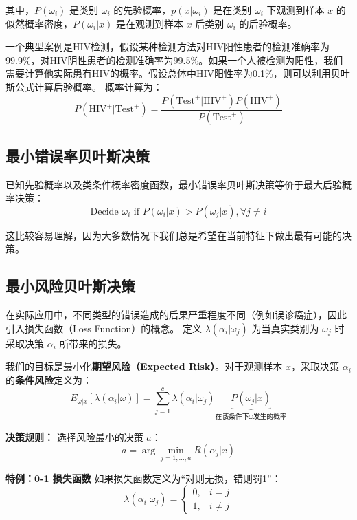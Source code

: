 \documentclass[a4paper, 11pt]{ctexart}
\begin{document}
其中，$P(\omega_i)$ 是类别 $\omega_i$ 的先验概率，$p(x|\omega_i)$ 是在类别 $\omega_i$ 下观测到样本 $x$ 的似然概率密度，$P(\omega_i|x)$ 是在观测到样本 $x$ 后类别 $\omega_i$ 的后验概率。

一个典型案例是HIV检测，假设某种检测方法对HIV阳性患者的检测准确率为99.9\%，对HIV阴性患者的检测准确率为99.5\%。如果一个人被检测为阳性，我们需要计算他实际患有HIV的概率。假设总体中HIV阳性率为0.1\%，则可以利用贝叶斯公式计算后验概率。
概率计算为：
\begin{equation}
    P(\text{HIV}^+| \text{Test}^+) = \frac{P(\text{Test}^+|\text{HIV}^+)P(\text{HIV}^+)}{P(\text{Test}^+)}
\end{equation}

\subsection{最小错误率贝叶斯决策}
已知先验概率以及类条件概率密度函数，最小错误率贝叶斯决策等价于最大后验概率决策：
\begin{equation}
    \text{Decide } \omega_i \text{ if } P(\omega_i|x) > P(\omega_j|x), \forall j \neq i
\end{equation}

这比较容易理解，因为大多数情况下我们总是希望在当前特征下做出最有可能的决策。

\subsection{最小风险贝叶斯决策}
在实际应用中，不同类型的错误造成的后果严重程度不同（例如误诊癌症），因此引入损失函数（Loss Function）的概念。
定义 $\lambda(\alpha_i|\omega_j)$ 为当真实类别为 $\omega_j$ 时采取决策 $\alpha_i$ 所带来的损失。

我们的目标是最小化\textbf{期望风险（Expected Risk）}。对于观测样本 $x$，采取决策 $\alpha_i$ 的\textbf{条件风险}定义为：
\begin{equation}
   E_{\omega|x}[\lambda(\alpha_i|\omega)] = \sum_{j=1}^{c} \lambda(\alpha_i|\omega_j) \underbrace{P(\omega_j|x)}_{\text{在该条件下}\omega\text{发生的概率}}
\end{equation}

\textbf{决策规则：}
选择风险最小的决策 $a$：
\begin{equation}
    a = \arg \min_{j=1,\dots,a} R(\alpha_j|x)
\end{equation}

\textbf{特例：0-1 损失函数}
如果损失函数定义为“对则无损，错则罚1”：
\begin{equation}
    \lambda(\alpha_i|\omega_j) = \begin{cases} 0, & i=j \\ 1, & i \neq j \end{cases}
\end{equation}
\end{document}
